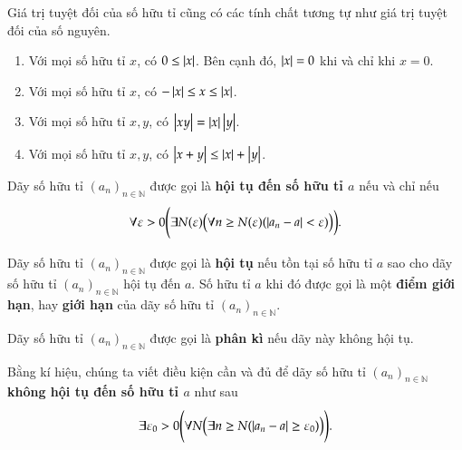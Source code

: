 Giá trị tuyệt đối của số hữu tỉ cũng có các tính chất tương tự như giá trị tuyệt đối của số nguyên.
\begin{theorem}
    \begin{enumerate}[label={(\roman*)}]
        \item Với mọi số hữu tỉ $x$, có $0 \leq \left\vert{x}\right\vert$. Bên cạnh đó, $\left\vert{x}\right\vert = 0$ khi và chỉ khi $x = 0$.
        \item Với mọi số hữu tỉ $x$, có $-\left\vert{x}\right\vert\leq x\leq \left\vert{x}\right\vert$.
        \item Với mọi số hữu tỉ $x, y$, có $\left\vert{xy}\right\vert = \left\vert{x}\right\vert\left\vert{y}\right\vert$.
        \item Với mọi số hữu tỉ $x, y$, có $\left\vert{x+y}\right\vert\leq \left\vert{x}\right\vert + \left\vert{y}\right\vert$.
    \end{enumerate}
\end{theorem}

\begin{definition}
    Dãy số hữu tỉ ${(a_{n})}_{n\in\mathbb{N}}$ được gọi là
    \textbf{hội tụ đến số hữu tỉ $a$} nếu và chỉ nếu
    \[
        \forall \varepsilon > 0 \Biggl(\exists N(\varepsilon)\Bigl(\forall n\geq N(\varepsilon)(\left\vert{a_{n} - a}\right\vert < \varepsilon)\bigr)\biggr).
    \]

    Dãy số hữu tỉ ${(a_{n})}_{n\in\mathbb{N}}$ được gọi là \textbf{hội tụ} nếu tồn tại số hữu tỉ $a$ sao cho dãy số hữu tỉ ${(a_{n})}_{n\in\mathbb{N}}$ hội tụ đến $a$. Số hữu tỉ $a$ khi đó được gọi là một \textbf{điểm giới hạn}, hay \textbf{giới hạn} của dãy số hữu tỉ ${(a_{n})}_{n\in\mathbb{N}}$.

    Dãy số hữu tỉ ${(a_{n})}_{n\in\mathbb{N}}$ được gọi là \textbf{phân kì} nếu dãy này không hội tụ.

    Bằng kí hiệu, chúng ta viết điều kiện cần và đủ để dãy số hữu tỉ ${(a_{n})}_{n\in\mathbb{N}}$ \textbf{không hội tụ đến số hữu tỉ $a$} như sau
    \[
        \exists\varepsilon_{0} > 0 \Biggl(\forall N\Bigl(\exists n\geq N (\left\vert{a_{n} - a}\right\vert\geq\varepsilon_{0} )\Bigr)\Biggr).
    \]
\end{definition}

